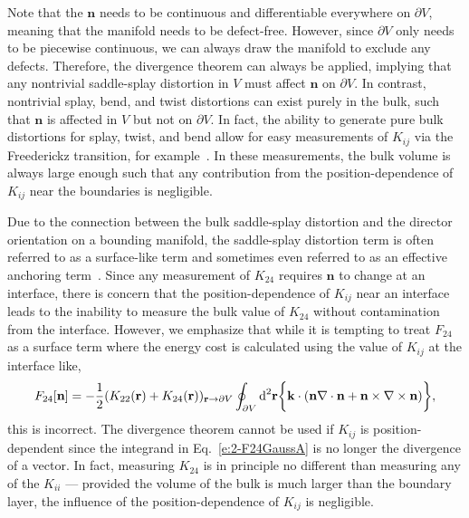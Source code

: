 Note that the $\mathbf{n}$ needs to be continuous and differentiable everywhere on $\partial V$, meaning that the manifold needs to be defect-free.
However, since $\partial V$ only needs to be piecewise continuous, we can always draw the manifold to exclude any defects.
Therefore, the divergence theorem can always be applied, implying that any nontrivial saddle-splay distortion in $V$ must affect $\mathbf{n}$ on $\partial V$.
In contrast, nontrivial splay, bend, and twist distortions can exist purely in the bulk, such that $\mathbf{n}$ is affected in $V$ but not on $\partial V$.
In fact, the ability to generate pure bulk distortions for splay, twist, and bend allow for easy measurements of $K_{ij}$ via the Freederickz transition, for example~\cite{RN212,RN213,RN33,RN188,RN182,RN183}.
In these measurements, the bulk volume is always large enough such that any contribution from the position-dependence of $K_{ij}$ near the boundaries is negligible.

Due to the connection between the bulk saddle-splay distortion and the director orientation on a bounding manifold, the saddle-splay distortion term is often referred to as a surface-like term and sometimes even referred to as an effective anchoring term~\cite{RN206,RN33,RN194,RN58,RN57,RN151}.
Since any measurement of $K_{24}$ requires $\mathbf{n}$ to change at an interface, there is concern that the position-dependence of $K_{ij}$ near an interface leads to the inability to measure the bulk value of $K_{24}$ without contamination from the interface.
However, we emphasize that while it is tempting to treat $F_{24}$ as a surface term where the energy cost is calculated using the value of $K_{ij}$ at the interface like,
\begin{equation}
  F_{24}[\mathbf{n}] = - \frac{1}{2}(K_{22}(\mathbf{r}) + K_{24}(\mathbf{r}))_{\mathbf{r} \rightarrow \partial V} \oint_{\partial V} \textup{d}^2  \mathbf{r} \bigg \{   \mathbf{k} \cdot (\mathbf{n}\nabla \cdot \mathbf{n} + \mathbf{n} \times \nabla \times \mathbf{n}) \bigg \},
\end{equation}
this is incorrect.
The divergence theorem cannot be used if $K_{ij}$ is position-dependent since the integrand in Eq.~\ref{e:2-F24GaussA} is no longer the divergence of a vector.
In fact, measuring $K_{24}$ is in principle no different than measuring any of the $K_{ii}$ --- provided the volume of the bulk is much larger than the boundary layer, the influence of the position-dependence of $K_{ij}$ is negligible.

